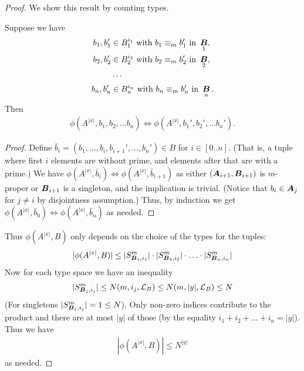 \documentclass{amsart}
\DeclareMathOperator{\A}{\boldface A}
\DeclareMathOperator{\B}{\boldface B}
\renewcommand{\LL}{\mathcal L}
\begin{document}
\begin{proof}
  We show this result by counting types.
  \begin{Claim}
    Suppose we have
    \begin{align*}
      b_1, b_1' &\in B_1^{i_1} \text{ with } b_1 \equiv_m b_1' \text { in } \B_1, \\
      b_2, b_2' &\in B_2^{i_2} \text{ with } b_2 \equiv_m b_2' \text { in } \B_2, \\
                &\cdots \\
      b_n, b_n' &\in B_n^{i_n} \text{ with } b_n \equiv_m b_n' \text { in } \B_n.
    \end{align*}
    Then
    \begin{align*}
      \phi(A^{|x|}, b_1, b_2, \ldots b_n) \iff \phi(A^{|x|}, b_1', b_2', \ldots b_n').
    \end{align*}
  \end{Claim}
  \begin{proof}
    Define $\bar b_i = (b_1, \ldots, b_i, b_{i+1}', \ldots, b_n') \in B$ for $i \in [0..n]$.
    (That is, a tuple where first $i$ elements are without prime, and elements after that are with a prime.)
    We have $\phi(A^{|x|}, \bar b_i) \iff \phi(A^{|x|}, \bar b_{i+1})$ as either $(\A_{i+1}, \B_{i+1})$ is $m$-proper
    or $\B_{i+1}$ is a singleton, and the implication is trivial.
    (Notice that $b_i \in \A_j$ for $j \neq i$ by disjointness assumption.)
    Thus, by induction we get $\phi(A^{|x|}, \bar b_0) \iff \phi(A^{|x|}, \bar b_n)$ as needed.
  \end{proof}
  Thus $\phi(A^{|x|}, B)$ only depends on the choice of the types for the tuples:
  \begin{align*}
    |\phi(A^{|x|}, B)| \leq |S^m_{\B_1, i_1}| \cdot |S^m_{\B_2, i_2}| \cdot \ldots \cdot |S^m_{\B_n, i_n}|
  \end{align*}
  Now for each type space we have an inequality
  \begin{align*}
    |S^m_{\B_j, i_j}| \leq N(m, i_j, \LL_B) \leq N(m, |y|, \LL_B) \leq N
  \end{align*}
  (For singletons $|S^m_{\B_j, i_j}| = 1 \leq N$). Only non-zero indices contribute to the product and there are at most $|y|$ of those (by the equality $i_1 + i_2 + \ldots + i_n = |y|$). Thus we have
  \begin{align*}
    |\phi(A^{|x|}, B)| \leq N^{|y|}
  \end{align*}
  as needed.
\end{proof}
\end{document}
